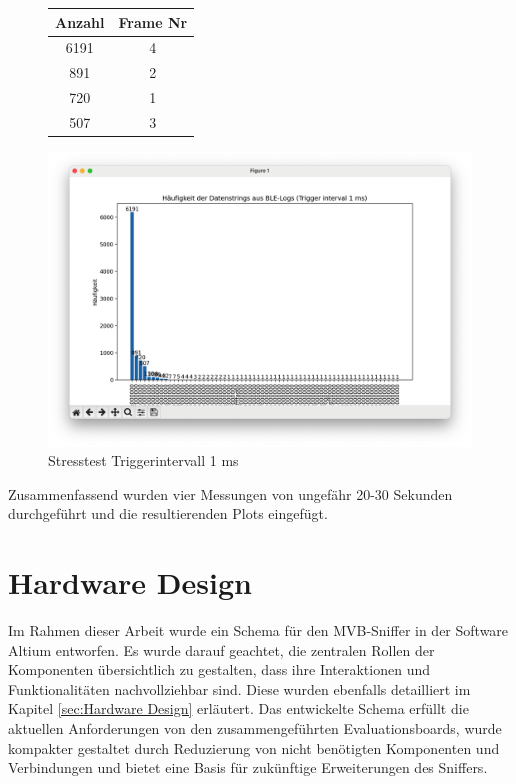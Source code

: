 \begin{figure}[H]
    \centering
    \begin{minipage}{0.29 \textwidth}
        \begin{tabular}{c||c}
            \toprule
            \textbf{Anzahl} & \textbf{Frame Nr} \\ 
            \midrule
            6191 & 4\\
            891 & 2 \\
            720 & 1 \\
            507 & 3 \\
            \bottomrule
        \end{tabular}
    \end{minipage}
    \hfill
    \begin{minipage}{0.7 \textwidth}
        \includegraphics[width=\linewidth]{Figures/Chap4/Stesstest/Stress_1.png}
    \caption{Stresstest Triggerintervall 1 ms}
    \label{fig:Stress1}
    \end{minipage}
\end{figure}

Zusammenfassend wurden vier Messungen von ungefähr 20-30 Sekunden durchgeführt und die resultierenden Plots eingefügt.

\section{Hardware Design}
\label{sec:ResultatHardware}
Im Rahmen dieser Arbeit wurde ein Schema für den MVB-Sniffer in der Software Altium entworfen. Es wurde darauf geachtet, die zentralen Rollen der Komponenten übersichtlich zu gestalten, dass ihre Interaktionen und Funktionalitäten nachvollziehbar sind. Diese wurden ebenfalls detailliert im Kapitel \ref{sec:Hardware Design} erläutert. Das entwickelte Schema erfüllt die aktuellen Anforderungen von den zusammengeführten Evaluationsboards, wurde kompakter gestaltet durch Reduzierung von nicht benötigten Komponenten und Verbindungen und bietet eine Basis für zukünftige Erweiterungen des Sniffers. 

